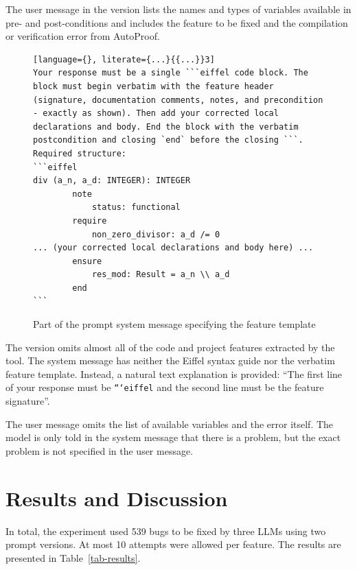 \documentclass[runningheads]{llncs}
\newcommand{\tabref}[1]{Table~\ref{#1}}
\begin{document}
The user message in the \rich{} version lists the names and types of variables
available in pre- and post-conditions and includes the feature to be fixed and
the compilation or verification error from AutoProof.

\begin{figure}
\begin{lstlisting}[language={}, literate={...}{{...}}3]
Your response must be a single ```eiffel code block. The block must begin verbatim with the feature header (signature, documentation comments, notes, and precondition - exactly as shown). Then add your corrected local declarations and body. End the block with the verbatim postcondition and closing `end` before the closing ```.
Required structure:
```eiffel
div (a_n, a_d: INTEGER): INTEGER
		note
			status: functional
		require
			non_zero_divisor: a_d /= 0
... (your corrected local declarations and body here) ...
		ensure
			res_mod: Result = a_n \\ a_d
		end
```
\end{lstlisting}
\caption{Part of the \rich{} prompt system message specifying the feature template}\label{full-template}
\end{figure}

The \bare{} version omits almost all of the code and project features extracted by the tool.
The system message has neither the Eiffel syntax guide nor the verbatim feature template.
Instead, a natural text explanation is provided: ``The first line of your
response must be \texttt{```eiffel} and the second line must be the feature signature''.

The user message omits the list of available variables and the error itself.
The model is only told in the system message that there is a problem,
but the exact problem is not specified in the user message.

\section{Results and Discussion}\label{results-and-discussion}
In total, the experiment used 539 bugs to be fixed by three LLMs
using two prompt versions. At most 10 attempts were allowed per feature.
The results are presented in \tabref{tab-results}.

\begin{table}
\caption{Bug-fixing results. Tool time includes verification. Cost is in USD cents.}
\label{tab-results}
\centering\footnotesize
\end{table}
\end{document}
